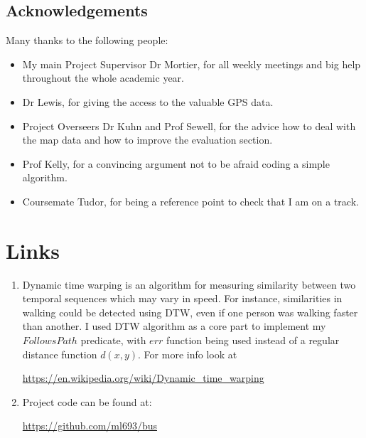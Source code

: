 \documentclass[12pt,a4paper,oneside,openright]{report}
\begin{document}
\section{Acknowledgements}

Many thanks to the following people:

\begin{itemize}

\item My main Project Supervisor Dr Mortier, for all weekly meetings and big help throughout
      the whole academic year.

\item Dr Lewis, for giving the access to the valuable GPS data.

\item Project Overseers Dr Kuhn and Prof Sewell, for the advice how to deal with the map data and
      how to improve the evaluation section.

\item Prof Kelly, for a convincing argument not to be afraid coding a simple algorithm.

\item Coursemate Tudor, for being a reference point to check that I am on a track.

\end{itemize}

\appendix

\chapter{Links}

\begin{enumerate}
\item Dynamic time warping is an algorithm for measuring similarity between
two temporal sequences which may vary in speed. For instance, similarities in
walking could be detected using DTW, even if one person was walking faster than
another. I used DTW algorithm as a core part to implement my $FollowsPath$
predicate, with $err$ function being used instead of a regular distance function 
$d(x, y)$.
For more info look at

\textcolor{blue}{\url{https://en.wikipedia.org/wiki/Dynamic_time_warping}}

\item Project code can be found at: 

\textcolor{blue}{\url{https://github.com/ml693/bus}}


\end{enumerate}
\end{document}
